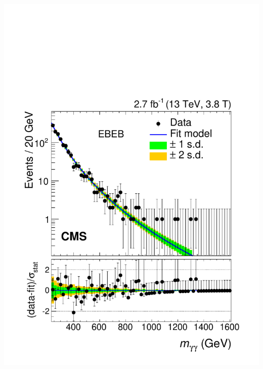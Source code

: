 \documentclass{beamer}
\begin{document}
\begin{frame}{}
\begin{columns}
      \tiny{\cite{Aaboud:2016zkn}}
      \hspace*{-1cm}
      \includegraphics[width=1\textwidth]{assets/diphoton_cms.pdf} \\
      \tiny{\cite{Khachatryan:2016hje}}
  \end{columns}
\end{frame}
\end{document}
